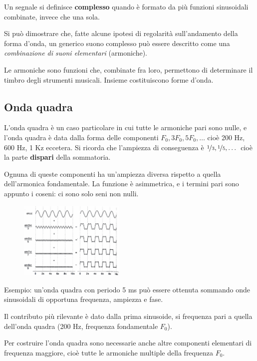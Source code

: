 Un segnale si definisce \textbf{complesso} quando è formato da più funzioni sinusoidali combinate, invece che una sola.

Si può dimostrare che, fatte alcune ipotesi di regolarità sull'andamento della forma d'onda, un generico suono complesso può essere descritto come una \textit{combinazione di suoni elementari} (armoniche).

Le armoniche sono funzioni che, combinate fra loro, permettono di determinare il timbro degli strumenti musicali. Insieme costituiscono forme d'onda. 

\subsection{Onda quadra}
L'onda quadra è un caso particolare in cui tutte le armoniche pari sono nulle, e l'onda quadra è data dalla forma delle componenti $F_0, 3F_0, 5F_0, \dots$ cioè 200 Hz, 600 Hz, 1 Kz eccetera. Si ricorda che l'ampiezza di conseguenza è $\nicefrac{1}{3}, \nicefrac{1}{5}, \dots$ cioè la parte \textbf{dispari} della sommatoria.

Ognuna di queste componenti ha un'ampiezza diversa rispetto a quella dell'armonica fondamentale. La funzione è asimmetrica, e i termini pari sono appunto i coseni: ci sono solo seni non nulli. 

\begin{figure}
	\vspace{-5pt}
	\includegraphics[width=0.45\textwidth]{Lezioni/Immagini/ondaquadra}
	\vspace{-25pt}
\end{figure}

Esempio: un'onda quadra con periodo 5 ms può essere ottenuta sommando onde sinusoidali di opportuna frequenza, ampiezza e fase.

Il contributo più rilevante è dato dalla prima sinusoide, si frequenza pari a quella dell'onda quadra (200 Hz, frequenza fondamentale $F_0$).

Per costruire l'onda quadra sono necessarie anche altre componenti elementari di frequenza maggiore, cioè tutte le armoniche multiple della frequenza $F_0$. \\

